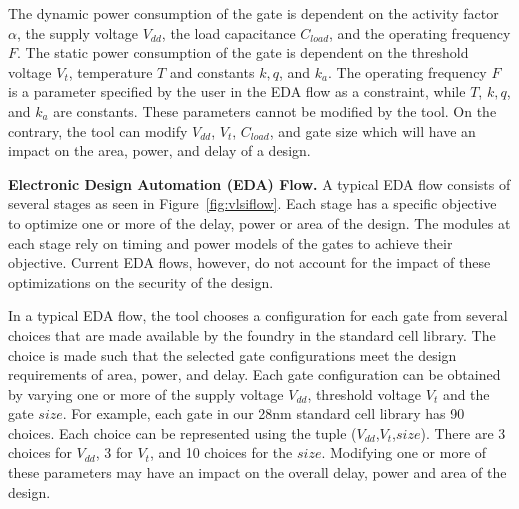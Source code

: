 The dynamic power consumption of the gate is dependent on the activity factor $\alpha$, the supply voltage $V_{dd}$, the load capacitance $C_{load}$, and the operating frequency $F$. The static power consumption of the gate is dependent on the threshold voltage $V_{t}$, temperature $T$ and constants $k,q$, and $k_{a}$. The operating frequency $F$ is a parameter specified by the user in the EDA flow as a constraint, while $T$, $k,q$, and $k_{a}$ are constants. These parameters cannot be modified by the tool. On the contrary, the tool can modify $V_{dd}$, $V_{t}$, $C_{load}$, and gate size which will have an impact on the area, power, and delay of a design. 






{\flushleft \bf Electronic Design Automation (EDA) Flow.}
A typical EDA flow consists of several stages as seen in Figure~\ref{fig:vlsiflow}. Each stage has a specific objective to optimize one or more of the delay, power or area of the design. The modules at each stage rely on timing and power models of the gates to achieve their objective. %
Current EDA flows, however, do not account for the impact of these optimizations on the security of the design. 


 In a typical EDA flow, the tool chooses a configuration for each gate from several choices that are made available by the foundry in the standard cell library. The choice is made such that the selected gate configurations meet the design requirements of area, power, and delay. Each gate configuration can be obtained by varying one or more of the supply voltage $V_{dd}$, threshold voltage $V_{t}$ and the gate $size$. For example, each gate in our 28nm standard cell library has 90 choices. Each choice can be represented using the tuple ($V_{dd}$,$V_{t}$,$size$). There are 3 choices for $V_{dd}$, 3 for $V_{t}$, and 10 choices for the $size$. Modifying one or more of these parameters may have an impact on the overall delay, power and area of the design.

